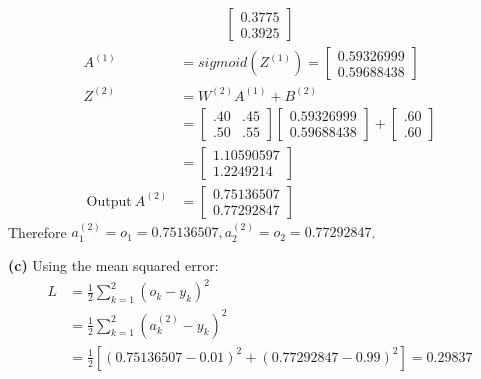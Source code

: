 \documentclass[a4paper, 12pt]{article}
\begin{document}
\begin{solution}
\begin{align*}
\begin{bmatrix}
        0.3775\\
        0.3925
        \end{bmatrix}
    \end{align*}
    \begin{align*}
        A^{(1)} &= sigmoid(Z^{(1)}) = \begin{bmatrix}
        0.59326999 \\ 0.59688438
        \end{bmatrix} \\
        Z^{(2)} &= W^{(2)} A^{(1)} + B^{(2)} \\
        &= \begin{bmatrix}
        .40 & .45 \\
        .50 & .55
        \end{bmatrix} \begin{bmatrix}
            0.59326999 \\ 0.59688438
            \end{bmatrix}  + \begin{bmatrix}
            .60 \\.60
            \end{bmatrix} \\
            &= \begin{bmatrix}
                1.10590597 \\1.2249214
            \end{bmatrix} \\
            \:\text{Output}\: A^{(2)} &= \begin{bmatrix}
                0.75136507 \\
                0.77292847
            \end{bmatrix}
    \end{align*}
    Therefore $a^{(2)}_1 = o_1 = 0.75136507, a^{(2)}_2 = o_2 = 0.77292847 $.

    \textbf{(c)} Using the mean squared error:
    \begin{align*}
        L &= \frac{1}{2} \sum_{k=1}^{2} (o_k - y_k)^2 \\
        &= \frac{1}{2} \sum_{k=1}^{2} (a^{(2)}_k - y_k)^2\\
        &= \frac{1}{2} [(0.75136507 - 0.01)^2 + (0.77292847 - 0.99)^2] = 0.29837
    \end{align*}


\end{solution}
\end{document}
